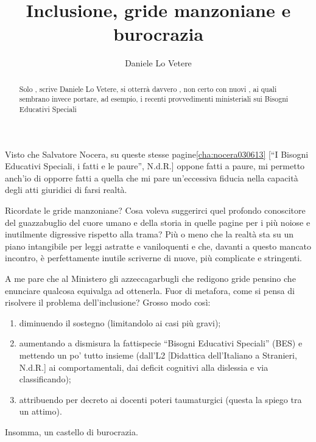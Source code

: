 \author{Daniele Lo Vetere}
\title{Inclusione, gride manzoniane e burocrazia}
\label{cha:danilellovetere1}
\begin{abstract}
Solo , scrive Daniele Lo Vetere, si otterrà davvero , non certo con nuovi , ai quali sembrano invece portare, ad esempio, i recenti provvedimenti ministeriali sui Bisogni Educativi Speciali
\end{abstract}
\maketitle
Visto che Salvatore Nocera, su queste stesse pagine\ref{cha:nocera030613} [“I Bisogni Educativi Speciali, i fatti e le paure”, N.d.R.] oppone fatti a paure, mi permetto anch'io di opporre fatti a quella che mi pare un'eccessiva fiducia nella capacità degli atti giuridici di farsi realtà.

Ricordate le gride manzoniane? Cosa voleva suggerirci quel profondo conoscitore del guazzabuglio del cuore umano e della storia in quelle pagine per i più noiose e inutilmente digressive rispetto alla trama? Più o meno che la realtà sta su un piano intangibile per leggi astratte e vaniloquenti e che, davanti a questo mancato incontro, è perfettamente inutile scriverne di nuove, più complicate e stringenti.

A me pare che al Ministero gli azzeccagarbugli che redigono gride pensino che enunciare qualcosa equivalga ad ottenerla.
Fuor di metafora, come si pensa di risolvere il problema dell'inclusione? Grosso modo così: 
\begin{enumerate}
	\item diminuendo il sostegno (limitandolo ai casi più gravi);
	\item  aumentando a dismisura la fattispecie “Bisogni Educativi Speciali” (BES) e mettendo un po' tutto insieme (dall'L2 [Didattica dell'Italiano a Stranieri, N.d.R.] ai comportamentali, dai deficit cognitivi alla dislessia e via classificando);
	\item  attribuendo per decreto ai docenti poteri taumaturgici (questa la spiego tra un attimo).
\end{enumerate}
 Insomma, un castello di burocrazia.

